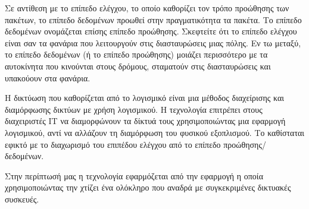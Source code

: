 Σε αντίθεση με το επίπεδο ελέγχου, το οποίο καθορίζει τον τρόπο προώθησης των πακέτων, το επίπεδο δεδομένων προωθεί στην πραγματικότητα τα πακέτα. 
Το επίπεδο δεδομένων ονομάζεται επίσης επίπεδο προώθησης. Σκεφτείτε ότι το επίπεδο ελέγχου είναι σαν τα φανάρια που λειτουργούν στις διασταυρώσεις μιας πόλης. 
Εν τω μεταξύ, το επίπεδο δεδομένων (ή το επίπεδο προώθησης) μοιάζει περισσότερο με τα αυτοκίνητα που κινούνται στους δρόμους, 
σταματούν στις διασταυρώσεις και υπακούουν στα φανάρια.


Η δικτύωση που καθορίζεται από το λογισμικό  είναι μια μέθοδος διαχείρισης και διαμόρφωσης δικτύων με χρήση λογισμικού. 
Η τεχνολογία  επιτρέπει στους διαχειριστές IT να διαμορφώνουν τα δίκτυά τους χρησιμοποιώντας μια εφαρμογή λογισμικού, 
αντί να αλλάζουν τη διαμόρφωση του φυσικού εξοπλισμού. Το  καθίσταται εφικτό με το διαχωρισμό του επιπέδου ελέγχου από το επίπεδο προώθησης/δεδομένων. 

Στην περίπτωσή μας η τεχνολογία  εφαρμόζεται από την  εφαρμογή η οποία χρησιμοποιώντας την  χτίζει ένα ολόκληρο
 που αναδρά με συγκεκριμένες δικτυακές συσκευές. 












